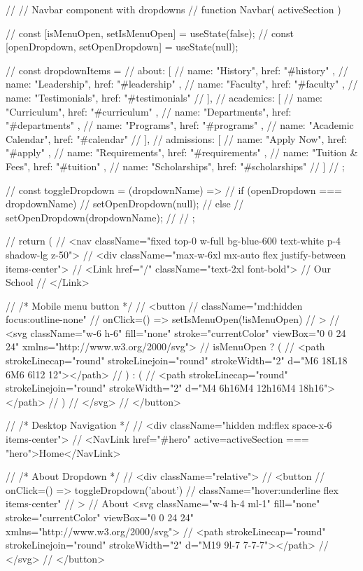 // // Navbar component with dropdowns
// function Navbar({ activeSection }) {
//   const [isMenuOpen, setIsMenuOpen] = useState(false);
//   const [openDropdown, setOpenDropdown] = useState(null);

//   const dropdownItems = {
//     about: [
//       { name: "History", href: "#history" },
//       { name: "Leadership", href: "#leadership" },
//       { name: "Faculty", href: "#faculty" },
//       { name: "Testimonials", href: "#testimonials" }
//     ],
//     academics: [
//       { name: "Curriculum", href: "#curriculum" },
//       { name: "Departments", href: "#departments" },
//       { name: "Programs", href: "#programs" },
//       { name: "Academic Calendar", href: "#calendar" }
//     ],
//     admissions: [
//       { name: "Apply Now", href: "#apply" },
//       { name: "Requirements", href: "#requirements" },
//       { name: "Tuition & Fees", href: "#tuition" },
//       { name: "Scholarships", href: "#scholarships" }
//     ]
//   };

//   const toggleDropdown = (dropdownName) => {
//     if (openDropdown === dropdownName) {
//       setOpenDropdown(null);
//     } else {
//       setOpenDropdown(dropdownName);
//     }
//   };

//   return (
//     <nav className="fixed top-0 w-full bg-blue-600 text-white p-4 shadow-lg z-50">
//       <div className="max-w-6xl mx-auto flex justify-between items-center">
//         <Link href="/" className="text-2xl font-bold">
//           Our School
//         </Link>
        
//         {/* Mobile menu button */}
//         <button 
//           className="md:hidden focus:outline-none"
//           onClick={() => setIsMenuOpen(!isMenuOpen)}
//         >
//           <svg className="w-6 h-6" fill="none" stroke="currentColor" viewBox="0 0 24 24" xmlns="http://www.w3.org/2000/svg">
//             {isMenuOpen ? (
//               <path strokeLinecap="round" strokeLinejoin="round" strokeWidth="2" d="M6 18L18 6M6 6l12 12"></path>
//             ) : (
//               <path strokeLinecap="round" strokeLinejoin="round" strokeWidth="2" d="M4 6h16M4 12h16M4 18h16"></path>
//             )}
//           </svg>
//         </button>
        
//         {/* Desktop Navigation */}
//         <div className="hidden md:flex space-x-6 items-center">
//           <NavLink href="#hero" active={activeSection === "hero"}>Home</NavLink>
          
//           {/* About Dropdown */}
//           <div className="relative">
//             <button 
//               onClick={() => toggleDropdown('about')}
//               className="hover:underline flex items-center"
//             >
//               About <svg className="w-4 h-4 ml-1" fill="none" stroke="currentColor" viewBox="0 0 24 24" xmlns="http://www.w3.org/2000/svg">
//                 <path strokeLinecap="round" strokeLinejoin="round" strokeWidth="2" d="M19 9l-7 7-7-7"></path>
//               </svg>
//             </button>
            
}
